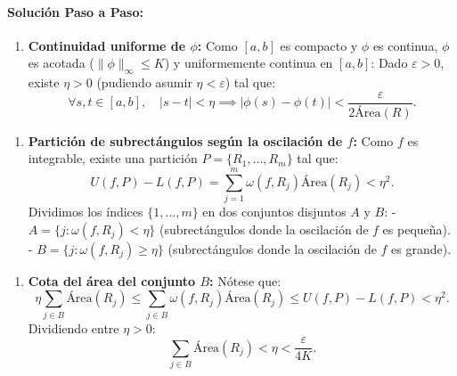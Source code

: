 \documentclass[11pt,a4paper]{article}
\begin{document}
\paragraph{Solución Paso a Paso:}\par
\begin{enumerate}[label=\textbf{\arabic*.}]
\item \textbf{Continuidad uniforme de $\phi$:}
Como $[a,b]$ es compacto y $\phi$ es continua, $\phi$ es acotada ($\|\phi\|_\infty \le K$) y uniformemente continua en $[a,b]$:
Dado $\varepsilon > 0$, existe $\eta > 0$ (pudiendo asumir $\eta < \varepsilon$) tal que:
\begin{equation*}
\forall s, t \in [a,b], \quad |s - t| < \eta \implies |\phi(s) - \phi(t)| < \frac{\varepsilon}{2\text{Área}(R)}.
\end{equation*}
\end{enumerate}

\begin{enumerate}[label=\textbf{\arabic*.}]
\item \textbf{Partición de subrectángulos según la oscilación de $f$:}
Como $f$ es integrable, existe una partición $P = \{R_1, \dots, R_m\}$ tal que:
\begin{equation*}
U(f, P) - L(f, P) = \sum_{j=1}^m \omega(f, R_j) \text{Área}(R_j) < \eta^2.
\end{equation*}
Dividimos los índices $\{1, \dots, m\}$ en dos conjuntos disjuntos $A$ y $B$:
- $A = \{j : \omega(f, R_j) < \eta\}$ (subrectángulos donde la oscilación de $f$ es pequeña).
- $B = \{j : \omega(f, R_j) \ge \eta\}$ (subrectángulos donde la oscilación de $f$ es grande).
\end{enumerate}

\begin{enumerate}[label=\textbf{\arabic*.}]
\item \textbf{Cota del área del conjunto $B$:}
Nótese que:
\begin{equation*}
\eta \sum_{j \in B} \text{Área}(R_j) \le \sum_{j \in B} \omega(f, R_j) \text{Área}(R_j) \le U(f, P) - L(f, P) < \eta^2.
\end{equation*}
Dividiendo entre $\eta > 0$:
\begin{equation*}
\sum_{j \in B} \text{Área}(R_j) < \eta < \frac{\varepsilon}{4K}.
\end{equation*}
\end{enumerate}
\end{document}
